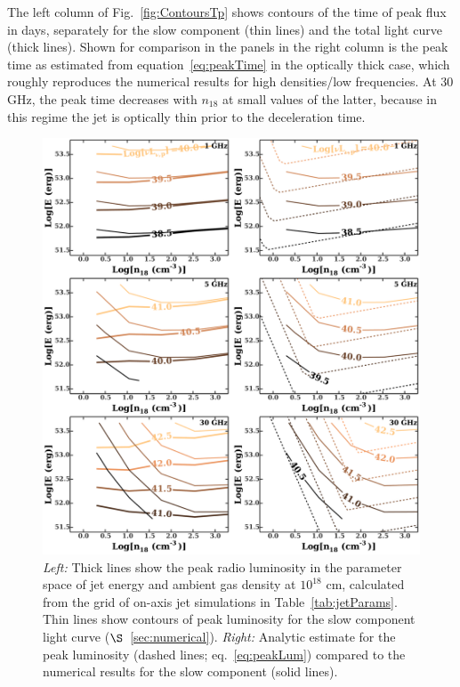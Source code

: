 \documentclass[usenatbib,fleqn]{mnras}
\begin{document}
The left column of Fig.~\ref{fig:ContoursTp} shows contours of the
time of peak flux in days, separately for the slow component (thin
lines) and the total light curve (thick lines).  Shown for comparison
in the panels in the right column is the peak time as estimated from
equation~\eqref{eq:peakTime} in the optically thick case, which
roughly reproduces the numerical results for high densities/low
frequencies. At 30 GHz, the peak time decreases with $n_{18}$ at small
values of the latter, because in this regime the jet is optically thin
prior to the deceleration time.


\begin{figure}
  \includegraphics[width=16cm]{lp_contours_new.pdf}
  \caption{\label{fig:jetContours} {\it {Left:}} Thick lines show the
    peak radio luminosity in the parameter space of jet energy and
    ambient gas density at $10^{18}$ cm, calculated from the grid of
    on-axis jet simulations in Table~\ref{tab:jetParams}. Thin lines
    show contours of peak luminosity for the slow component light
    curve ($\S$~\ref{sec:numerical}). {\it Right:} Analytic estimate
    for the peak luminosity (dashed lines; eq.~\ref{eq:peakLum})
    compared to the numerical results for the slow component (solid
    lines).}
\end{figure}
\end{document}
